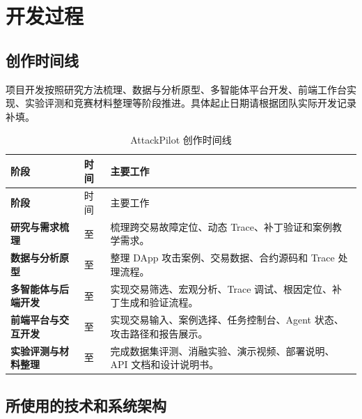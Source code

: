 \documentclass[UTF8,a4paper,12pt]{ctexart}
\begin{document}
\section{开发过程}

\subsection{创作时间线}

项目开发按照研究方法梳理、数据与分析原型、多智能体平台开发、前端工作台实现、实验评测和竞赛材料整理等阶段推进。具体起止日期请根据团队实际开发记录补填。

\begin{longtable}{>{\bfseries}p{}p{}p{}}
  \caption{AttackPilot 创作时间线}\label{tab:timeline}\\
  \toprule
  阶段 & 时间 & 主要工作 \\
  \midrule
  \endfirsthead
  \toprule
  阶段 & 时间 & 主要工作 \\
  \midrule
  \endhead
  研究与需求梳理 & \underline{\hspace{20mm}} 至 \underline{\hspace{20mm}} & 梳理跨交易故障定位、动态 Trace、补丁验证和案例教学需求。 \\
  数据与分析原型 & \underline{\hspace{20mm}} 至 \underline{\hspace{20mm}} & 整理 DApp 攻击案例、交易数据、合约源码和 Trace 处理流程。 \\
  多智能体与后端开发 & \underline{\hspace{20mm}} 至 \underline{\hspace{20mm}} & 实现交易筛选、宏观分析、Trace 调试、根因定位、补丁生成和验证流程。 \\
  前端平台与交互开发 & \underline{\hspace{20mm}} 至 \underline{\hspace{20mm}} & 实现交易输入、案例选择、任务控制台、Agent 状态、攻击路径和报告展示。 \\
  实验评测与材料整理 & \underline{\hspace{20mm}} 至 \underline{\hspace{20mm}} & 完成数据集评测、消融实验、演示视频、部署说明、API 文档和设计说明书。 \\
  \bottomrule
\end{longtable}

\subsection{所使用的技术和系统架构}
\end{document}
